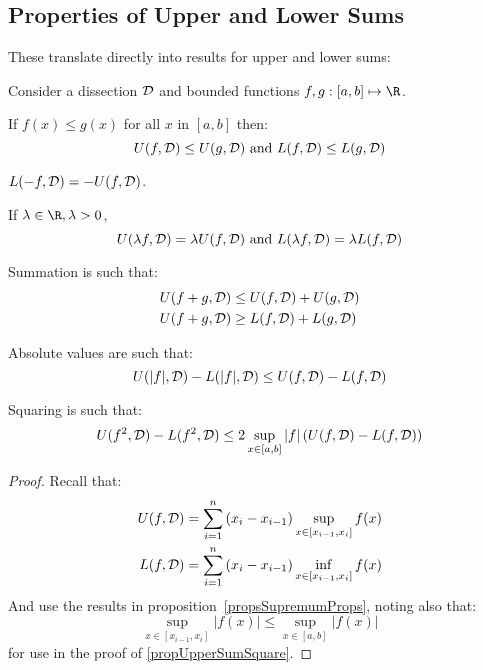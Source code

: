 \documentclass[../Main.tex]{subfiles}
\begin{document}
\subsection{Properties of Upper and Lower Sums}
These translate directly into results for upper and lower sums:
\begin{propositions}{
        Consider a dissection $\mathcal{D}$ and bounded functions $f, g : [a, b] \mapsto \R$.
        \label{propsUpperSumProps}
    }
    \item If $f(x) \leq g(x)$ for all $x$ in $[a, b]$ then:
        \begin{equation*}
            U(f, \mathcal{D}) \leq U(g, \mathcal{D}) \text{ and } L(f, \mathcal{D}) \leq L(g, \mathcal{D})
        \end{equation*}
        \label{propupperSumPreservesOrdering}
    \item $L(-f, \mathcal{D}) = -U(f, \mathcal{D})$. \label{propUpperSumNegative}
    \item If $\lambda \in \R, \lambda > 0$,
        \begin{equation*}
            U(\lambda f, \mathcal{D}) = \lambda U(f, \mathcal{D}) \text{ and } L(\lambda f, \mathcal{D}) = \lambda L(f, \mathcal{D})
        \end{equation*}
        \label{propUpperSumConstant}
    \item Summation is such that:
        \begin{align*}
            U(f + g, \mathcal{D}) &\leq U(f, \mathcal{D}) + U(g, \mathcal{D}) \\
            U(f + g, \mathcal{D}) &\geq L(f, \mathcal{D}) + L(g, \mathcal{D})
        \end{align*}
        \label{propUpperSumSum}
    \item Absolute values are such that:
        \begin{equation*}
            U(|f|, \mathcal{D}) - L(|f|, \mathcal{D}) \leq U(f, \mathcal{D}) - L(f, \mathcal{D})
        \end{equation*}
        \label{propUpperSumAbs}
    \item Squaring is such that:
        \begin{equation*}
            U(f^2, \mathcal{D}) - L(f^2, \mathcal{D}) \leq 2\sup_{x \in [a, b]} |f| \left(U(f, \mathcal{D}) - L(f, \mathcal{D})\right)
        \end{equation*}
        \label{propUpperSumSquare}
\end{propositions}
\begin{proof}
    Recall that:
    \begin{align*}
        U(f, \mathcal{D}) &= \sum_{i = 1}^n \left(x_i - x_{i - 1}\right) \sup_{x \in [x_{i - 1}, x_i]} f(x) \\
        L(f, \mathcal{D}) &= \sum_{i = 1}^n \left(x_i - x_{i - 1}\right) \inf_{x \in [x_{i - 1}, x_i]} f(x)
    \end{align*}
    And use the results in proposition~\ref{propsSupremumProps}, noting also that:
    \begin{equation*}
        \sup_{x \in [x_{i - 1}, x_i]} |f(x)| \leq \sup_{x \in [a, b]} |f(x)|
    \end{equation*}
    for use in the proof of \ref{propUpperSumSquare}.
\end{proof}
\end{document}
